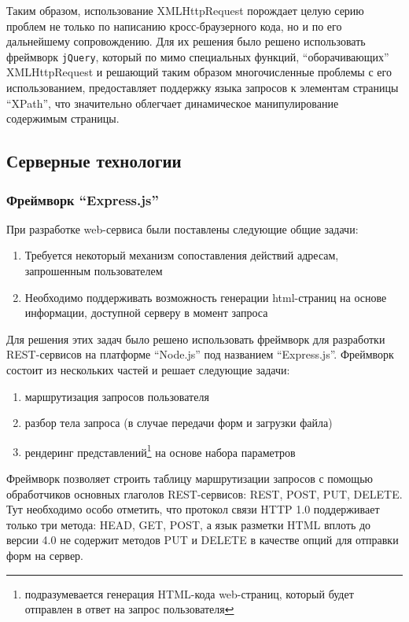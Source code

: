 \documentclass[14pt, a4paper]{extarticle}
\begin{document}
Таким образом, использование XMLHttpRequest порождает целую серию проблем не
только по написанию кросс-браузерного кода, но и по его дальнейшему
сопровождению. Для их решения было решено использовать фреймворк
\texttt{jQuery}, который по мимо специальных функций, ``оборачивающих''
XMLHttpRequest и решающий таким образом многочисленные проблемы с его
использованием, предоставляет поддержку языка запросов к элементам страницы
``XPath'', что значительно облегчает динамическое манипулирование содержимым
страницы.

\subsection{Серверные технологии}

\subsubsection{Фреймворк ``Express.js''}

При разработке web-сервиса были поставлены следующие общие задачи:

\begin{enumerate}
    \item Требуется некоторый механизм сопоставления действий адресам, запрошенным
    пользователем
    \item Необходимо поддерживать возможность генерации html-страниц на основе
    информации, доступной серверу в момент запроса
\end{enumerate}

Для решения этих задач было решено использовать фреймворк для разработки
REST-сервисов на платформе ``Node.js'' под названием ``Express.js''. Фреймворк
состоит из нескольких частей и решает следующие задачи:

\begin{enumerate}
    \item маршрутизация запросов пользователя
    \item разбор тела запроса (в случае передачи форм и загрузки файла)
    \item рендеринг представлений\footnote{подразумевается генерация HTML-кода
    web-страниц, который будет отправлен в ответ на запрос
    пользователя} на основе набора параметров
\end{enumerate}

Фреймворк позволяет строить таблицу маршрутизации запросов с помощью
обработчиков основных глаголов REST-сервисов: REST, POST, PUT, DELETE. Тут
необходимо особо отметить, что протокол связи HTTP 1.0 поддерживает только три
метода: HEAD, GET, POST, а язык разметки HTML вплоть до версии 4.0 не содержит
методов PUT и DELETE в качестве опций для отправки форм на сервер.
\end{document}
